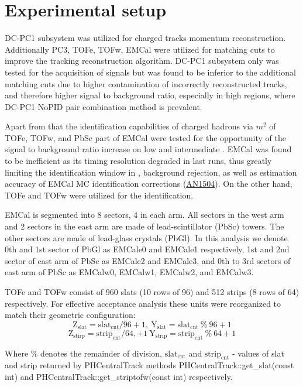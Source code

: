 \section{Experimental setup}

DC-PC1 subsystem was utilized for charged tracks momentum reconstruction. 
Additionally PC3, TOFe, TOFw, EMCal were utilized for matching cuts to improve the tracking reconstruction algorithm. 
DC-PC1 subsystem only was tested for the acquisition of \kstar signals but was found to be inferior to the additional matching cuts due to higher contamination of incorrectly reconstructed tracks, and therefore higher signal to background ratio, especially in high \pT regions, where DC-PC1 NoPID pair combination method is prevalent.

Apart from that the identification capabilities of charged hadrons via $m^2$ of TOFe, TOFw, and PbSc part of EMCal were tested for the opportunity of the signal to background ratio increase on low and intermediate \pT. 
EMCal was found to be inefficient as its timing resolution degraded in last runs, thus greatly limiting the identification window in \pT, background rejection, as well as estimation accuracy of EMCal MC identification corrections (\href{https://phenix-intra.sdcc.bnl.gov/phenix/WWW/p/draft/berd/Sergei/AN_AuAu_KStar.pdf}{AN1504}). 
On the other hand, TOFe and TOFw were utilized for the identification.

EMCal is segmented into 8 sectors, 4 in each arm. 
All sectors in the west arm and 2 sectors in the east arm are made of lead-scintillator (PbSc) towers. The other sectors are made of lead-glass crystals (PbGl). 
In this analysis we denote 0th and 1st sector of PbGl as EMCale0 and EMCale1 respectively, 1st and 2nd sector of east arm of PbSc as EMCale2 and EMCale3, and 0th to 3rd sectors of east arm of PbSc as EMCalw0, EMCalw1, EMCalw2, and EMCalw3.

TOFe and TOFw consist of 960 slats (10 rows of 96) and 512 strips (8 rows of 64) respectively. For effective acceptance analysis these units were reorganized to match their geometric configuration: 
\begin{equation}
   \text{Z}_{\text{slat}} = \text{slat}_{\text{cnt}}/96 + 1, \ \text{Y}_{\text{slat}} = \text{slat}_{\text{cnt}} \ \% \ 96 + 1
\end{equation}
\begin{equation}
\text{Z}_{\text{stirp}} = \text{strip}_{\text{cnt}}/64, + 1 \ \text{Y}_{\text{strip}} = \text{strip}_{\text{cnt}} \ \% \ 64 + 1
\end{equation}

Where $\%$ denotes the remainder of division, $\text{slat}_{\text{cnt}}$ and $\text{strip}_{\text{cnt}}$ - values of slat and strip returned by PHCentralTrack methods PHCentralTrack::get\_slat(const int) and PHCentralTrack::get\_striptofw(const int) respectively.
